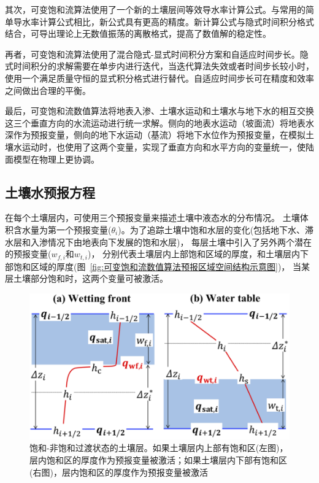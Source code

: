 其次，可变饱和流算法使用了一个新的土壤层间等效导水率计算公式。与常用的简单导水率计算公式相比，新公式具有更高的精度。新计算公式与隐式时间积分格式结合，可导出理论上无数值振荡的离散格式，提高了数值解的稳定性。

再者，可变饱和流算法使用了混合隐式-显式时间积分方案和自适应时间步长。隐式时间积分的求解需要在单步内进行迭代，当迭代算法失效或者时间步长较小时，使用一个满足质量守恒的显式积分格式进行替代。自适应时间步长可在精度和效率之间做出合理的平衡。

最后，可变饱和流数值算法将地表入渗、土壤水运动和土壤水与地下水的相互交换这三个垂直方向的水流运动进行统一求解。侧向的地表水运动（坡面流）将地表水深作为预报变量，侧向的地下水运动（基流）将地下水位作为预报变量，在模拟土壤水运动时，也使用了这两个变量，实现了垂直方向和水平方向的变量统一，使陆面模型在物理上更协调。


\subsection{土壤水预报方程}
在每个土壤层内，可使用三个预报变量来描述土壤中液态水的分布情况。
土壤体积含水量为第一个预报变量($\theta_i$)。为了追踪土壤中饱和水层的变化(包括地下水、滞水层和入渗情况下由地表向下发展的饱和水层)，
每层土壤中引入了另外两个潜在的预报变量($w_{f,i}$和$w_{t,i}$)，
分别代表土壤层内上部饱和区域的厚度，和土壤层内下部饱和区域的厚度(图~\ref{fig:可变饱和流数值算法预报区域空间结构示意图})，
当某层土壤部分饱和时，这两个变量可被激活。
{
\begin{figure}[htbp]
\centering
\includegraphics{Figures/陆地表面的水分循环/饱和-非饱和过渡状态的土壤层.png}
\caption[饱和-非饱和过渡状态的土壤层]{饱和-非饱和过渡状态的土壤层。如果土壤层内上部有饱和区(左图)，
层内饱和区的厚度作为预报变量被激活；如果土壤层内下部有饱和区(右图)，层内饱和区的厚度作为预报变量被激活}
\label{fig:饱和-非饱和过渡状态的土壤层}
\end{figure}
}


